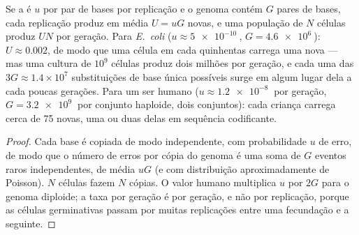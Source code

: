 \begin{theorem}\label{thm:b2:genome-diversification:rate}
Se a  é $u$ por par de bases por replicação e o genoma
contém $G$ pares de bases, cada replicação produz em média
$U = uG$  novas, e uma população de $N$ células produz $UN$
por geração. Para \emph{E.~coli} ($u \approx \qty{5e-10}{}$, $G =
\qty{4.6e6}{}$): $U \approx 0.002$, de modo que uma célula em cada
quinhentas carrega uma  nova --- mas uma cultura de $10^{9}$
células produz dois milhões por geração, e cada uma das $3G \approx 1.4\times
10^{7}$ substituições de base única possíveis surge em algum lugar
dela a cada poucas gerações. Para um ser humano
($u \approx \qty{1.2e-8}{}$ por
geração, $G = \qty{3.2e9}{}$ por conjunto haploide, dois conjuntos):
cada criança carrega cerca de \num{75}  novas, uma ou duas
delas em sequência codificante.
\end{theorem}
\begin{proof}
Cada base é copiada de modo independente, com probabilidade $u$ de
erro, de modo que o número de erros por cópia do genoma é uma soma de
$G$ eventos raros independentes, de média $uG$ (e com distribuição
aproximadamente de Poisson). $N$ células fazem $N$ cópias. O valor
humano multiplica $u$ por $2G$ para o genoma diploide; a taxa por
geração é por geração, e não por replicação, porque as células
germinativas passam por muitas replicações entre uma fecundação e a
seguinte.
\end{proof}

